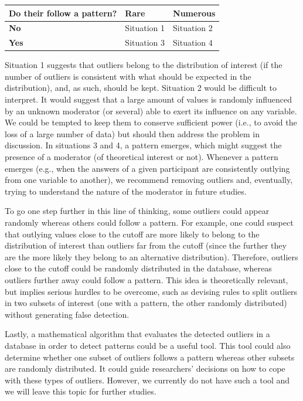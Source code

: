 \documentclass[man,floatsintext]{apa6}
\begin{document}
\begin{longtable}[]{@{}lll@{}}
\toprule
\textbf{Do their follow a pattern?} & Rare & Numerous\tabularnewline
\midrule
\endhead
\textbf{No} & Situation 1 & Situation 2\tabularnewline
\textbf{Yes} & Situation 3 & Situation 4\tabularnewline
\bottomrule
\end{longtable}

Situation 1 suggests that outliers belong to the distribution of
interest (if the number of outliers is consistent with what should be
expected in the distribution), and, as such, should be kept. Situation 2
would be difficult to interpret. It would suggest that a large amount of
values is randomly influenced by an unknown moderator (or several) able
to exert its influence on any variable. We could be tempted to keep them
to conserve sufficient power (i.e., to avoid the loss of a large number
of data) but should then address the problem in discussion. In
situations 3 and 4, a pattern emerges, which might suggest the presence
of a moderator (of theoretical interest or not). Whenever a pattern
emerges (e.g., when the answers of a given participant are consistently
outlying from one variable to another), we recommend removing outliers
and, eventually, trying to understand the nature of the moderator in
future studies.

To go one step further in this line of thinking, some outliers could
appear randomly whereas others could follow a pattern. For example, one
could suspect that outlying values close to the cutoff are more likely
to belong to the distribution of interest than outliers far from the
cutoff (since the further they are the more likely they belong to an
alternative distribution). Therefore, outliers close to the cutoff could
be randomly distributed in the database, whereas outliers further away
could follow a pattern. This idea is theoretically relevant, but implies
serious hurdles to be overcome, such as devising rules to split outliers
in two subsets of interest (one with a pattern, the other randomly
distributed) without generating false detection.

Lastly, a mathematical algorithm that evaluates the detected outliers in
a database in order to detect patterns could be a useful tool. This tool
could also determine whether one subset of outliers follows a pattern
whereas other subsets are randomly distributed. It could guide
researchers' decisions on how to cope with these types of outliers.
However, we currently do not have such a tool and we will leave this
topic for further studies.
\end{document}
